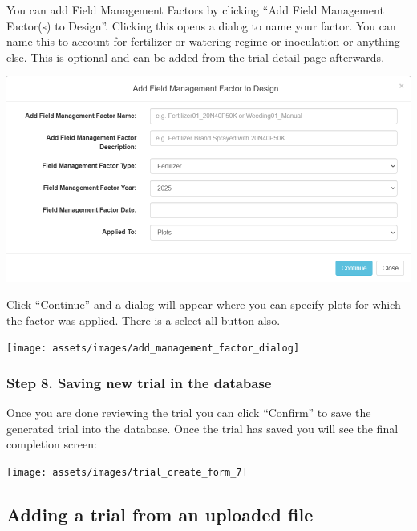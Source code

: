 \documentclass[
  12pt,
]{book}
\begin{document}
You can add Field Management Factors by clicking ``Add Field Management Factor(s) to Design''. Clicking this opens a dialog to name your factor. You can name this to account for fertilizer or watering regime or inoculation or anything else. This is optional and can be added from the trial detail page afterwards.

\begin{center}\includegraphics[width=0.95\linewidth]{assets/images/add_management_factor_name_dialog} \end{center}

Click ``Continue'' and a dialog will appear where you can specify plots for which the factor was applied. There is a select all button also.

\begin{center}\texttt{[image: assets/images/add\_management\_factor\_dialog]} \end{center}

\hypertarget{step-8.-saving-new-trial-in-the-database}{%
\subsubsection*{Step 8. Saving new trial in the database}\label{step-8.-saving-new-trial-in-the-database}}


Once you are done reviewing the trial you can click ``Confirm'' to save the generated trial into the database. Once the trial has saved you will see the final completion screen:

\begin{center}\texttt{[image: assets/images/trial\_create\_form\_7]} \end{center}

\hypertarget{adding-a-trial-from-an-uploaded-file}{%
\subsection{Adding a trial from an uploaded file}\label{adding-a-trial-from-an-uploaded-file}}
\end{document}
